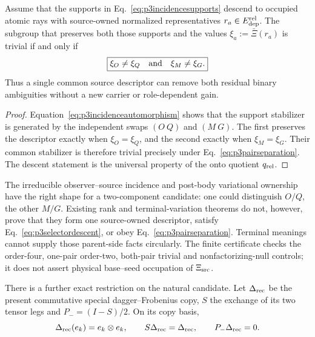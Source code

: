\begin{proposition}
\label{prop:p3pairselector}
Assume that the supports in Eq.~\eqref{eq:p3incidencesupports} descend to
occupied atomic rays with source-owned normalized representatives
$r_a\in E_{\rm dep}^{\rm rel}$.  The subgroup that
preserves both those supports and the values
$\xi_a:=\bar\Xi(r_a)$ is trivial if and only if
\begin{equation}
 \boxed{\xi_O\ne\xi_Q\quad\hbox{and}\quad\xi_M\ne\xi_G.}
 \label{eq:p3pairseparation}
\end{equation}
Thus a single common source descriptor can remove both residual binary
ambiguities without a new carrier or role-dependent gain.
\end{proposition}

\begin{proof}
Equation~\eqref{eq:p3incidenceautomorphism} shows that the support stabilizer
is generated by the independent swaps $(O\ Q)$ and $(M\ G)$.  The first
preserves the descriptor exactly when $\xi_O=\xi_Q$, and the second exactly
when $\xi_M=\xi_G$.  Their common stabilizer is therefore trivial precisely
under Eq.~\eqref{eq:p3pairseparation}.  The descent statement is the universal
property of the onto quotient $q_{\rm rel}$.
\end{proof}

The irreducible observer--source incidence and post-body variational ownership
have the right shape for a two-component candidate: one could distinguish
$O/Q$, the other $M/G$.  Existing rank and terminal-variation theorems do not,
however, prove that they form one source-owned descriptor, satisfy
Eq.~\eqref{eq:p3selectordescent}, or obey
Eq.~\eqref{eq:p3pairseparation}.  Terminal meanings cannot supply those
parent-side facts circularly.  The finite certificate checks the order-four,
one-pair order-two, both-pair trivial and nonfactorizing-null controls; it does
not assert physical base--seed occupation of $\Xi_{\rm src}$.

There is a further exact restriction on the natural candidate. Let
$\Delta_{\rm rec}$ be the present commutative special dagger--Frobenius copy,
$S$ the exchange of its two tensor legs and $P_-=(I-S)/2$. On its copy basis,
\begin{equation}
 \Delta_{\rm rec}(e_k)=e_k\otimes e_k,
 \qquad S\Delta_{\rm rec}=\Delta_{\rm rec},
 \qquad P_-\Delta_{\rm rec}=0.
 \label{eq:p3frobeniusorientation}
\end{equation}

